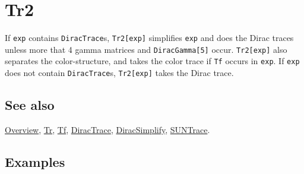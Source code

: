 \documentclass[../FeynCalcManual.tex]{subfiles}
\begin{document}
\hypertarget{tr2}{
\section{Tr2}\label{tr2}}

If \texttt{exp} contains \texttt{DiracTrace}s,
\texttt{Tr2[\allowbreak{}exp]} simplifies \texttt{exp} and does the
Dirac traces unless more that 4 gamma matrices and
\texttt{DiracGamma[\allowbreak{}5]} occur.
\texttt{Tr2[\allowbreak{}exp]} also separates the color-structure, and
takes the color trace if \texttt{Tf} occurs in \texttt{exp}. If
\texttt{exp} does not contain \texttt{DiracTrace}s,
\texttt{Tr2[\allowbreak{}exp]} takes the Dirac trace.

\subsection{See also}

\hyperlink{toc}{Overview}, \hyperlink{tr}{Tr}, \hyperlink{tf}{Tf},
\hyperlink{diractrace}{DiracTrace},
\hyperlink{diracsimplify}{DiracSimplify},
\hyperlink{suntrace}{SUNTrace}.

\subsection{Examples}
\end{document}
